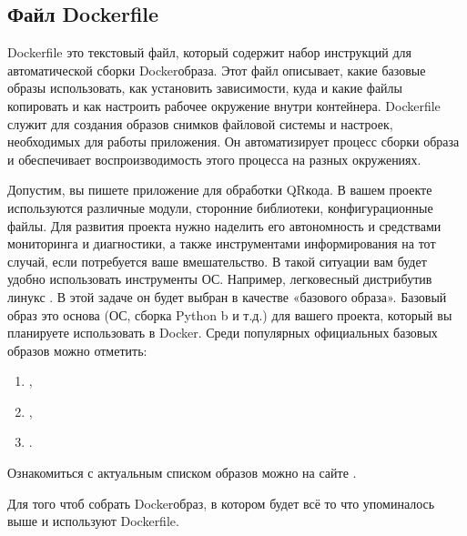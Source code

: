 \documentclass[letterpaper,10pt,russian]{sphinxmanual}
\begin{document}
\subsection{Файл Dockerfile}
\label{\detokenize{educational_materials/docker_base/content:dockerfile}}
\sphinxAtStartPar
Dockerfile \textendash{} это текстовый файл, который содержит набор инструкций для автоматической сборки Docker\sphinxhyphen{}образа. Этот файл описывает, какие базовые образы использовать, как установить зависимости, куда и какие файлы копировать и как настроить рабочее окружение внутри контейнера. Dockerfile служит для создания образов \textendash{} снимков файловой системы и настроек, необходимых для работы приложения. Он автоматизирует процесс сборки образа и обеспечивает воспроизводимость этого процесса на разных окружениях.

\sphinxAtStartPar
Допустим, вы пишете приложение для обработки QR\sphinxhyphen{}кода. В вашем проекте используются различные модули, сторонние библиотеки, конфигурационные файлы. Для развития проекта нужно наделить  его автономность и средствами мониторинга и диагностики, а также инструментами информирования на тот случай, если потребуется ваше вмешательство. В такой ситуации вам будет удобно использовать инструменты ОС. Например, легковесный дистрибутив линукс . В этой задаче он будет выбран в качестве «базового образа». Базовый образ это основа (ОС, сборка Python b и т.д.) для вашего проекта, который вы планируете использовать в Docker. Среди популярных официальных базовых образов можно отметить:
\begin{enumerate}
%
\item {} 
\sphinxAtStartPar
{},

\item {} 
\sphinxAtStartPar
{},

\item {} 
\sphinxAtStartPar
{}.

\end{enumerate}

\sphinxAtStartPar
Ознакомиться с актуальным списком образов можно на сайте .

\sphinxAtStartPar
Для того чтоб собрать Docker\sphinxhyphen{}образ, в котором будет всё то что упоминалось выше и используют Dockerfile.
\end{document}
